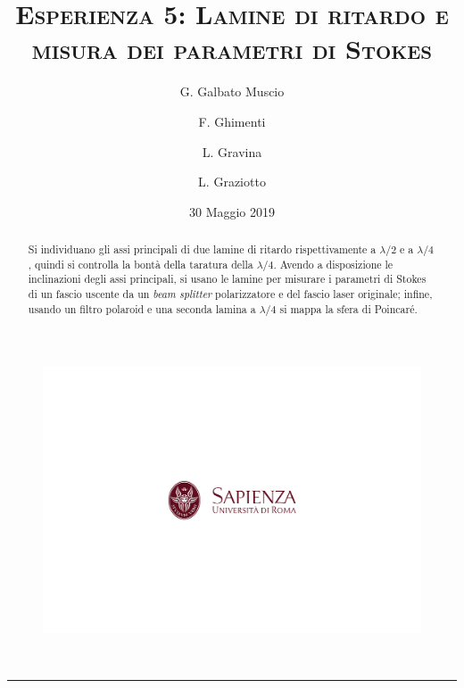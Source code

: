 \documentclass[10pt,oneside,a4paper]{article}
\title{\textsc{\textbf{Esperienza 5}: Lamine di ritardo e misura dei parametri di Stokes}}
\author{\small{G. Galbato Muscio} \and \small{F. Ghimenti} \and \small{L. Gravina} \and \small{L. Graziotto}}
\date{30 Maggio 2019}
\begin{document}
	\begin{figure}
		\centering
		\includegraphics[scale=0.5, trim={2.8cm 8.9cm 0 9cm}, clip]{logo.png}
	\end{figure}
	\maketitle
	\begin{center} 
		 \\
	\end{center}
\hrule
\vfill
\renewcommand{\abstractname}{Abstract}
\begin{abstract}
Si individuano gli assi principali di due lamine di ritardo rispettivamente a $\lambda/2$ e a $\lambda/4$, quindi si controlla la bontà della taratura della $\lambda/4$. Avendo a disposizione le inclinazioni degli assi principali, si usano le lamine per misurare i parametri di Stokes di un fascio uscente da un \emph{beam splitter} polarizzatore e del fascio laser originale; infine, usando un filtro polaroid e una seconda lamina a $\lambda/4$ si mappa la sfera di Poincaré. 
\end{abstract}
\vfill
\tableofcontents %
\newpage


\pagebreak
\end{document}
